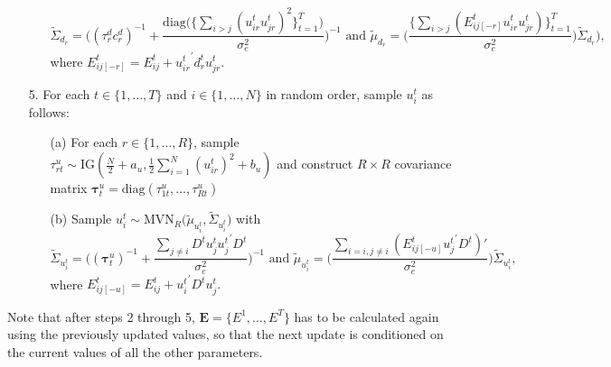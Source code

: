 \documentclass[a4paper]{article}
\begin{document}
\begin{itemize}
\begin{enumerate}
			$$\tilde{\Sigma}_{d_r} = \Big((\tau_r^d{c_r^d})^{-1}+\frac{\mbox{diag}\big(\{\sum_{i>j}({u^t_{ir}u^t_{jr}})^2\}_{t=1}^{T}\big)}{\sigma_e^2}\Big)^{-1} \mbox{ and } \tilde{\mu}_{d_r} =  \Big(\frac{\{\sum_{i>j}(E^{t}_{ij[-r]}u^t_{ir}u^t_{jr})\}_{t=1}^{T}}{\sigma_e^2}\Big)\tilde{\Sigma}_{d_r}),$$
			where $E^{t}_{ij[-r]}=E^t_{ij}+{u^t_{ir}}^\prime d^t_{r}u^t_{jr}$.
		\end{enumerate}		
		\item [5.] For each $t \in \{1,\ldots,T\}$ and $i \in \{1,\ldots,N\}$ in random order, sample $u^t_{i}$ as follows:
		\begin{enumerate}
			\item[(a)] For each $r \in \{1,\ldots,R\}$, sample $\tau_{rt}^{u} \sim \mbox{IG}(\frac{N}{2}+a_u, \frac{1}{2}\sum\limits_{i=1}^N (u^t_{ir})^2 + b_u)$ and construct $R\times R$ covariance matrix $\boldsymbol{\tau}^u_t = \mbox{diag}(\tau_{1t}^{u},\ldots, \tau_{Rt}^{u})$
					\item [(b)] Sample $u^t_{i}\sim \mbox{MVN}_R\big(\tilde{\mu}_{u^t_{i}}, \tilde{\Sigma}_{u^t_{i}} \big)$ with 
			$$\tilde{\Sigma}_{u^t_{i}} = \Big((\boldsymbol{\tau}^u_t)^{-1}+\frac{\sum_{j\neq i}D^tu^t_{j}{u^t_{j}}^\prime D^t}{\sigma_e^2}\Big)^{-1}\mbox{ and } \tilde{\mu}_{u^t_{i}} = \Big(\frac{\sum_{i=i, j\neq i}(E^{t}_{ij[-u]}{u^t_{j}}^\prime D^t)'}{{\sigma_e^2}}\Big)\tilde{\Sigma}_{u^t_{i}},$$ 
			where $E^{t}_{ij[-u]}=E^t_{ij}+{u^t_{i}}^\prime D^tu^t_{j}.$
		\end{enumerate}			
	\end{itemize}
	Note that after steps 2 through 5, $\mathbf{E} = \{E^1,\ldots, E^T\}$ has to be calculated again using the previously updated values, so that the next update is conditioned on the current values of all the other parameters. 
\end{document}
